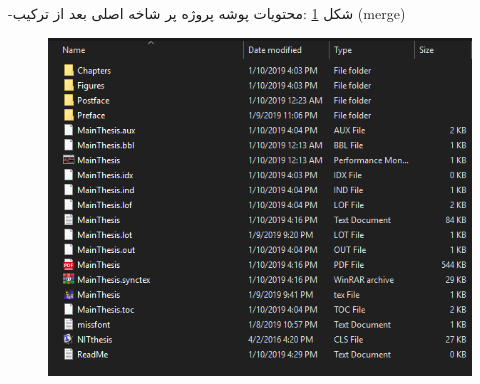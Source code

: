 -شکل \ref{n8} :محتویات پوشه پروژه پر شاخه اصلی بعد از ترکیب (merge) 
\begin{figure}[tbh]
	\centering
	\includegraphics[width=1\textwidth]{./Figures/n9}
	\caption{  }
	\label{n8}
\end{figure}